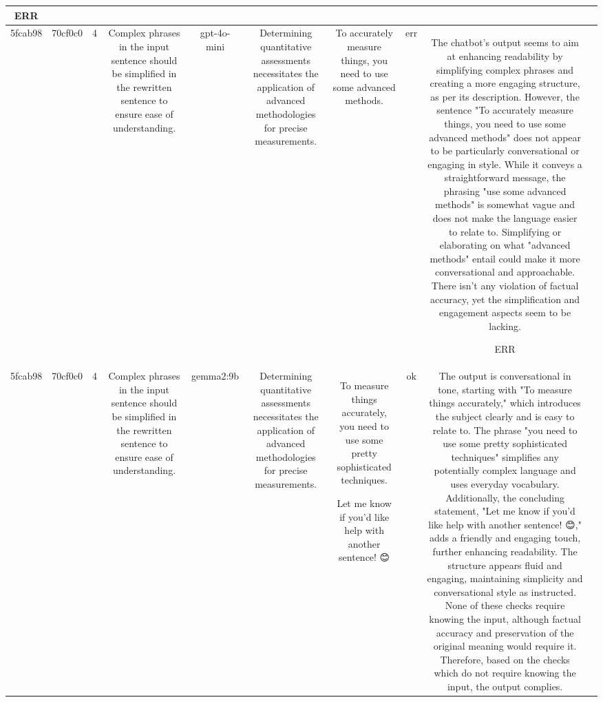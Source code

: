 \begin{table}[h!]
\begin{tabular}{|c|c|c|c|c|c|c|c|c|c|}
ERR & \\
\hline
5fcab98 & 70cf0c0 & 4 & Complex phrases in the input sentence should be simplified in the rewritten sentence to ensure ease of understanding. & gpt-4o-mini & Determining quantitative assessments necessitates the application of advanced methodologies for precise measurements. & To accurately measure things, you need to use some advanced methods. & err & The chatbot's output seems to aim at enhancing readability by simplifying complex phrases and creating a more engaging structure, as per its description. However, the sentence "To accurately measure things, you need to use some advanced methods" does not appear to be particularly conversational or engaging in style. While it conveys a straightforward message, the phrasing "use some advanced methods" is somewhat vague and does not make the language easier to relate to. Simplifying or elaborating on what "advanced methods" entail could make it more conversational and approachable. There isn't any violation of factual accuracy, yet the simplification and engagement aspects seem to be lacking.

ERR & \\
\hline
5fcab98 & 70cf0c0 & 4 & Complex phrases in the input sentence should be simplified in the rewritten sentence to ensure ease of understanding. & gemma2:9b & Determining quantitative assessments necessitates the application of advanced methodologies for precise measurements. & To measure things accurately, you need to use some pretty sophisticated techniques.  


Let me know if you'd like help with another sentence! 😊 
 & ok & The output is conversational in tone, starting with "To measure things accurately," which introduces the subject clearly and is easy to relate to. The phrase "you need to use some pretty sophisticated techniques" simplifies any potentially complex language and uses everyday vocabulary. Additionally, the concluding statement, "Let me know if you'd like help with another sentence! 😊," adds a friendly and engaging touch, further enhancing readability. The structure appears fluid and engaging, maintaining simplicity and conversational style as instructed. None of these checks require knowing the input, although factual accuracy and preservation of the original meaning would require it. Therefore, based on the checks which do not require knowing the input, the output complies.


\end{tabular}
\end{table}
